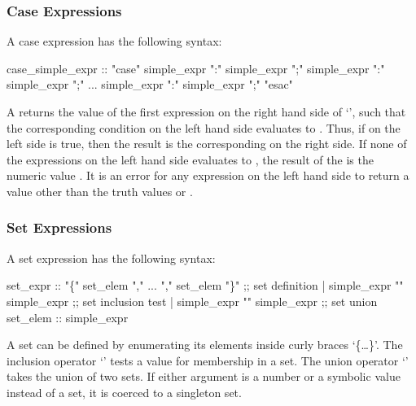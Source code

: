 \subsubsection{Case Expressions}
\label{case expressions}
A case expression has the following syntax:
\begin{Grammar}
case_simple_expr ::
          "case"
             simple_expr ":" simple_expr ";"
             simple_expr ":" simple_expr ";"
             ...
             simple_expr ":" simple_expr ";"
          "esac"
\end{Grammar}
%
A  returns the value of the first expression
on the right hand side of `\code{:}', such that the corresponding
condition on the left hand side evaluates to . Thus, if
 on the left side is true, then the result is the
corresponding  on the right side. If none of the
expressions on the left hand side evaluates to , the result of
the  is the numeric value . It is an
error for any expression on the left hand side to return a value other
than the truth values  or .

\subsubsection{Set Expressions}
\label{set expressions}
%
A set expression has the following syntax:
%
\begin{Grammar}
set_expr ::
            "\{" set_elem "," ... "," set_elem "\}" ;; set definition
         |  simple_expr "" simple_expr       ;; set inclusion test
         |  simple_expr "" simple_expr    ;; set union
set_elem :: simple_expr
\end{Grammar}
%
A set can be defined by enumerating its elements inside curly braces
`\{\ldots\}'. The inclusion operator `' tests a value for
membership in a set. The union operator `' takes the union
of two sets. If either argument is a number or a symbolic value
instead of a set, it is coerced to a singleton set.


